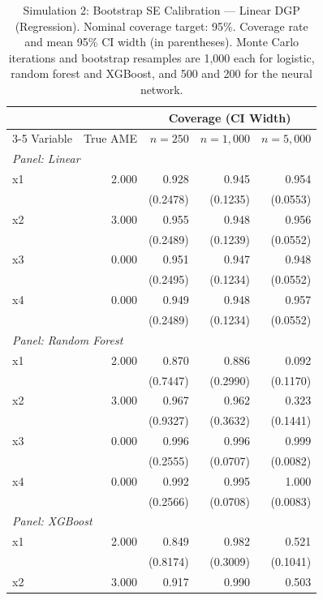 \begin{table}[htbp]
\centering
\small
\begin{threeparttable}
\caption{Simulation 2: Bootstrap SE Calibration --- Linear DGP (Regression). Nominal coverage target: 95\%. Coverage rate and mean 95\% CI width (in parentheses). Monte Carlo iterations and bootstrap resamples are 1{,}000 each for logistic, random forest and XGBoost, and 500 and 200 for the neural network.}
\label{tab:sim2_calibration_regression_linear}
\begin{tabular}{lrrrr}
\toprule
 & & \multicolumn{3}{c}{Coverage (CI Width)} \\
\cmidrule(lr){3-5}
Variable & True AME & $n=250$ & $n=1,000$ & $n=5,000$ \\
\midrule
\multicolumn{5}{l}{\textit{Panel: Linear}} \\
\quad x1 & 2.000 & 0.928 & 0.945 & 0.954 \\
 &  & (0.2478) & (0.1235) & (0.0553) \\
\quad x2 & 3.000 & 0.955 & 0.948 & 0.956 \\
 &  & (0.2489) & (0.1239) & (0.0552) \\
\quad x3 & 0.000 & 0.951 & 0.947 & 0.948 \\
 &  & (0.2495) & (0.1234) & (0.0552) \\
\quad x4 & 0.000 & 0.949 & 0.948 & 0.957 \\
 &  & (0.2489) & (0.1234) & (0.0552) \\
\midrule
\multicolumn{5}{l}{\textit{Panel: Random Forest}} \\
\quad x1 & 2.000 & 0.870 & 0.886 & 0.092 \\
 &  & (0.7447) & (0.2990) & (0.1170) \\
\quad x2 & 3.000 & 0.967 & 0.962 & 0.323 \\
 &  & (0.9327) & (0.3632) & (0.1441) \\
\quad x3 & 0.000 & 0.996 & 0.996 & 0.999 \\
 &  & (0.2555) & (0.0707) & (0.0082) \\
\quad x4 & 0.000 & 0.992 & 0.995 & 1.000 \\
 &  & (0.2566) & (0.0708) & (0.0083) \\
\midrule
\multicolumn{5}{l}{\textit{Panel: XGBoost}} \\
\quad x1 & 2.000 & 0.849 & 0.982 & 0.521 \\
 &  & (0.8174) & (0.3009) & (0.1041) \\
\quad x2 & 3.000 & 0.917 & 0.990 & 0.503 \\

\end{tabular}
\end{threeparttable}
\end{table}
